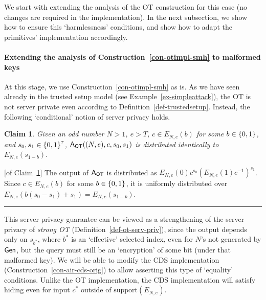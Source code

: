 \documentclass[11pt]{article}
\newtheorem{claim}[theorem]{Claim}
\newenvironment{proof}{\noindent {\bf Proof:} \hspace{.677em}}%
                     {\qed}
\newcommand{\qed}{\hspace*{\fill}\rule{0.6em}{0.6em}}
\newcommand{\gen}{{\sf Gen}}
\newcommand{\ansot}{{\sf A_{OT}}}
\newcommand{\otl}{{\tau}}
\newcommand{\encdj}{{E}_{N,e}}
\newcommand\ot{\mbox{OT}\xspace}
\newcommand\strongot{{\em strong \ot\xspace}}
\newcommand{\encr}[2]{E_{#1}(#2)}
\newcommand{\mathify}[1]{\ifmmode{#1}\else\mbox{$#1$}\fi}
\newcommand{\set}[2][]{\mathify{{\left\{#2\right\}}^{#1}}}
\newcommand{\bools}[1][]{\set[#1]{0,1}}
\newcommand{\support}{{\mathrm{support}}}
\begin{document}
We start with extending the analysis of the \ot construction for this case (no changes are required in the implementation). In the next subsection, we show how to ensure this `harmlessness' conditions, and show how to adapt the primitives' implementation accordingly.
\paragraph{Extending the analysis of Construction~\ref{con-otimpl-smh} to malformed keys}
At this stage, we use Construction~\ref{con-otimpl-smh} as is. As we have seen already in the trusted setup model (see Example~\ref{ex-simpleattack}), the \ot is not server private even according to Definition~\ref{def-trustedsetup}. Instead, the following `conditional' notion of server privacy holds.
\begin{claim}
\label{clm-ot-priv-mal}
Given an odd number $N>1$, $e>T$, $c\in\encdj(b)$ for some $b\in\bools$, and $s_0,s_1\in{\bools[\otl]}$, $\ansot((N,e),c,s_0,s_1)$ is distributed identically to $\encr{N,e}{s_{1-b}}$.
\end{claim}
\begin{proof}[of Claim~\ref{clm-ot-priv-mal}]
The output of $\ansot$ is distributed as $\encdj(0)c^{s_0}(\encdj(1)c^{-1})^{s_1}$. Since $c\in\encdj(b)$
for some $b\in\bools$, it is uniformly distributed over $\encdj(b(s_0-s_1)+s_1)=\encdj(s_{1-b})$.
\end{proof}

This server privacy guarantee can be viewed as a strengthening of
the server privacy of \strongot
(Definition~\ref{def-ot-serv-priv}), since the output depends only
on $s_{b^*}$, where $b^*$ is an `effective' selected index, even
for $N$'s not generated by $\gen$, but the query must still be an
`encryption' of some bit (under that malformed key). We will be
able to modify the CDS implementation
(Construction~\ref{con-air-cds-orig}) to allow asserting this type
of `equality' conditions. Unlike the \ot implementation, the CDS
implementation will satisfy hiding even for input $c^*$ outside of
$\support(\encdj)$.
\end{document}
